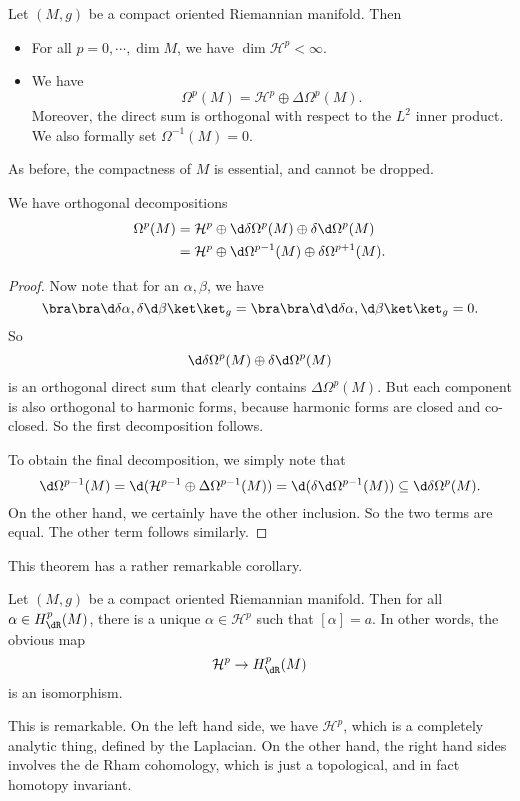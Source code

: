 \documentclass[a4paper]{article}
\begin{document}
\begin{thm}
  Let $(M, g)$ be a compact oriented Riemannian manifold. Then
  \begin{itemize}
    \item For all $p = 0, \cdots, \dim M$, we have $\dim \mathcal{H}^p < \infty$.
    \item We have
      \[
        \Omega^p(M) = \mathcal{H}^p \oplus \Delta \Omega^p(M).
      \]
      Moreover, the direct sum is orthogonal with respect to the $L^2$ inner product. We also formally set $\Omega^{-1}(M) = 0$.
  \end{itemize}
\end{thm}
As before, the compactness of $M$ is essential, and cannot be dropped.
\begin{cor}
  We have orthogonal decompositions
  \begin{align*}
    \Omega^p(M) &= \mathcal{H}^p \oplus \d \delta \Omega^p(M) \oplus \delta \d \Omega^p(M)\\
    &= \mathcal{H}^p \oplus \d \Omega^{p - 1}(M) \oplus \delta \Omega^{p + 1}(M).
  \end{align*}
\end{cor}

\begin{proof}
  Now note that for an $\alpha, \beta$, we have
  \[
    \bra \bra \d \delta \alpha, \delta \d \beta\ket\ket_g = \bra \bra \d \d \delta \alpha, \d \beta\ket \ket_g = 0.
  \]
  So
  \[
    \d \delta \Omega^p(M) \oplus \delta \d \Omega^p(M)
  \]
  is an orthogonal direct sum that clearly contains $\Delta \Omega^p(M)$. But each component is also orthogonal to harmonic forms, because harmonic forms are closed and co-closed. So the first decomposition follows.

  To obtain the final decomposition, we simply note that
  \[
    \d \Omega^{p - 1}(M) = \d (\mathcal{H}^{p - 1} \oplus \Delta \Omega^{p - 1}(M)) = \d (\delta \d \Omega^{p - 1}(M)) \subseteq \d \delta \Omega^p(M).
  \]
  On the other hand, we certainly have the other inclusion. So the two terms are equal. The other term follows similarly.
\end{proof}

This theorem has a rather remarkable corollary.
\begin{cor}
  Let $(M, g)$ be a compact oriented Riemannian manifold. Then for all $\alpha \in H_{\dR}^p(M)$, there is a unique $\alpha \in \mathcal{H}^p$ such that $[\alpha] = a$. In other words, the obvious map
  \[
    \mathcal{H}^p \to H_{\dR}^p(M)
  \]
  is an isomorphism.
\end{cor}
This is remarkable. On the left hand side, we have $\mathcal{H}^p$, which is a completely analytic thing, defined by the Laplacian. On the other hand, the right hand sides involves the de Rham cohomology, which is just a topological, and in fact homotopy invariant.
\end{document}
